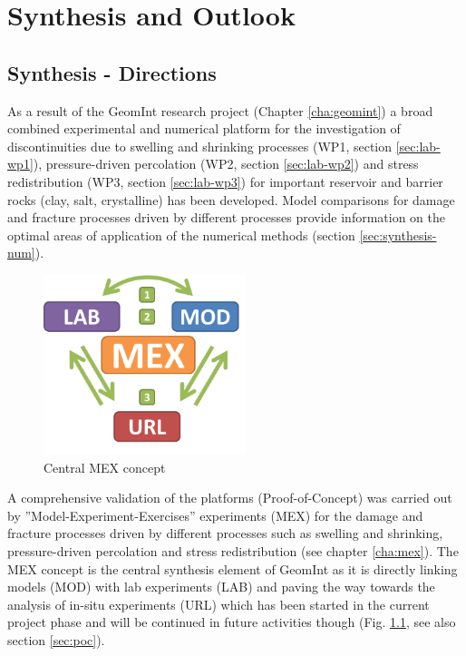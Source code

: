 \chapter{Synthesis and Outlook}
\label{cha:out}

\section{Synthesis - Directions}

As a result of the GeomInt research project (Chapter \ref{cha:geomint}) a broad combined experimental and numerical platform for the investigation of discontinuities due to swelling and shrinking processes (WP1, section \ref{sec:lab-wp1}), pressure-driven percolation (WP2, section \ref{sec:lab-wp2}) and stress redistribution (WP3, section \ref{sec:lab-wp3}) for important reservoir and barrier rocks (clay, salt, crystalline) has been developed. Model comparisons for damage and fracture processes driven by different processes provide information on the optimal areas of application of the numerical methods (section \ref{sec:synthesis-num}). 

\begin{figure}
\centering
\includegraphics[width=5.9cm]{figures/geomint-mex.png}
\caption{Central MEX concept}
\label{fig:synthesis-mex}
\end{figure}
A comprehensive validation of the platforms (\glqq{}Proof-of-Concept\grqq) was carried out by ''Model-Experiment-Exercises'' experiments (MEX) for the damage and fracture processes driven by different processes such as swelling and shrinking, pressure-driven percolation and stress redistribution (see chapter \ref{cha:mex}).
The MEX concept is the central synthesis element of GeomInt as it is directly linking models (MOD) with lab experiments (LAB) and paving the way towards the analysis of in-situ experiments (URL) which has been started in the current project phase and will be continued in future activities though (Fig. \ref{fig:synthesis-mex}, see also section \ref{sec:poc}).

